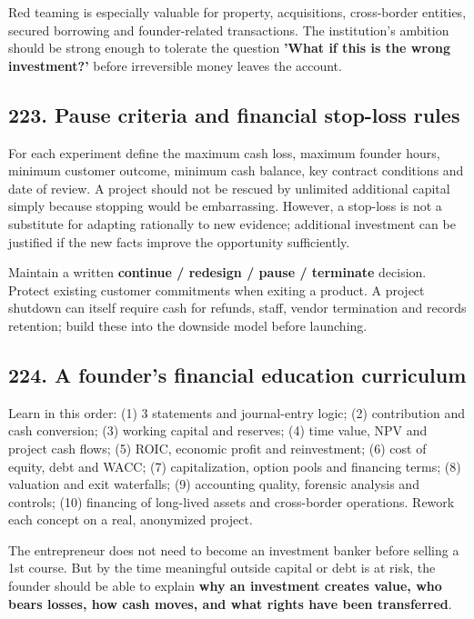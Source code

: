 Red teaming is especially valuable for property, acquisitions, cross-border entities, secured borrowing and founder-related transactions. The institution's ambition should be strong enough to tolerate the question \textbf{'What if this is the wrong investment?'} before irreversible money leaves the account.

\subsection{223. Pause criteria and financial stop-loss rules}


For each experiment define the maximum cash loss, maximum founder hours, minimum customer outcome, minimum cash balance, key contract conditions and date of review. A project should not be rescued by unlimited additional capital simply because stopping would be embarrassing. However, a stop-loss is not a substitute for adapting rationally to new evidence; additional investment can be justified if the new facts improve the opportunity sufficiently.

Maintain a written \textbf{continue / redesign / pause / terminate} decision. Protect existing customer commitments when exiting a product. A project shutdown can itself require cash for refunds, staff, vendor termination and records retention; build these into the downside model before launching.

\subsection{224. A founder's financial education curriculum}


Learn in this order: (1) 3 statements and journal-entry logic; (2) contribution and cash conversion; (3) working capital and reserves; (4) time value, NPV and project cash flows; (5) ROIC, economic profit and reinvestment; (6) cost of equity, debt and WACC; (7) capitalization, option pools and financing terms; (8) valuation and exit waterfalls; (9) accounting quality, forensic analysis and controls; (10) financing of long-lived assets and cross-border operations. Rework each concept on a real, anonymized project.

The entrepreneur does not need to become an investment banker before selling a 1st course. But by the time meaningful outside capital or debt is at risk, the founder should be able to explain \textbf{why an investment creates value, who bears losses, how cash moves, and what rights have been transferred}.

